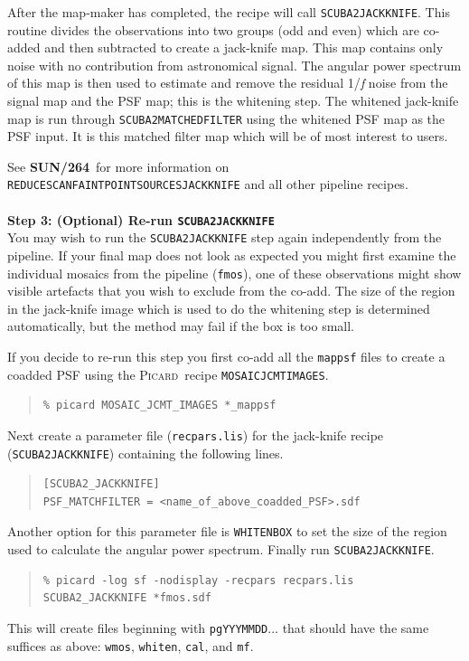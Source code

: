 \documentclass[twoside,11pt]{article}
\newcommand{\xref}[3]{#1}
\renewcommand{\_}{\texttt{\symbol{95}}}
\newenvironment{myquote}{
   \color{MidnightBlue}\begin{quote}\begin{small}}{
   \end{small}\end{quote}
}
\newcommand{\picard}{\xref{\textsc{Picard}}{sun265}{}}
\newcommand{\drrecipe}[1]{\texttt{#1}}
\newcommand{\param}[1]{\texttt{#1}}
\newcommand{\file}[1]{\texttt{#1}}
\newcommand{\pipelinesun}{\xref{\textbf{SUN/264}}{sun264}{}}
\renewenvironment{myquote}{
      \begin{quote}\begin{small}}{
      \end{small}\end{quote}
   }
\begin{document}
After the map-maker has completed, the recipe will call
\xref{\drrecipe{SCUBA2\_JACKKNIFE}}{sun265}{SCUBA2_JACKKNIFE}. This
routine divides the observations into two groups (odd and even) which
are co-added and then subtracted to create a jack-knife map. This map
contains only noise with no contribution from astronomical signal. The
angular power spectrum of this map is then used to estimate and remove
the residual 1/\emph{f} noise from the signal map and the PSF map;
this is the whitening step. The whitened jack-knife map is run through
\xref{\drrecipe{SCUBA2\_MATCHED\_FILTER}}{sun265}{SCUBA2_MATCHED_FILTER}
using the whitened PSF map as the PSF input. It is this matched filter
map which will be of most interest to users.

See \pipelinesun\ for more information on
\drrecipe{REDUCE\_SCAN\_FAINT\_POINT\_SOURCES\_JACKKNIFE} and all other pipeline
recipes.
\\ \\
\textbf{Step 3: (Optional) Re-run \drrecipe{SCUBA2\_JACKKNIFE}}\\
You may wish to run the \drrecipe{SCUBA2\_JACKKNIFE} step again
independently from the pipeline. If your final map does not look as
expected you might first examine the individual mosaics from the
pipeline (\file{\_fmos}), one of these observations might show visible
artefacts that you wish to exclude from the co-add. The size of the
region in the jack-knife image which is used to do the whitening step
is determined automatically, but the method may fail if the box is too
small.

If you decide to re-run this step you first co-add all the
\file{\_mappsf} files to create a coadded PSF using the \picard\ recipe
\xref{\drrecipe{MOSAIC\_JCMT\_IMAGES}}{sun265}{MOSAIC_JCMT_IMAGES}.
\begin{myquote}
\begin{verbatim}
% picard MOSAIC_JCMT_IMAGES *_mappsf
\end{verbatim}
\end{myquote}
Next create a parameter file (\file{recpars.lis}) for the jack-knife
recipe (\drrecipe{SCUBA2\_JACKKNIFE}) containing the following lines.
\begin{quote}
\begin{verbatim}
[SCUBA2_JACKKNIFE]
PSF_MATCHFILTER = <name_of_above_coadded_PSF>.sdf
\end{verbatim}
\end{quote}
Another option for this parameter file is \param{WHITEN\_BOX} to set the
size of the region used to calculate the angular power spectrum.
Finally run \drrecipe{SCUBA2\_JACKKNIFE}.
\begin{myquote}
\begin{verbatim}
% picard -log sf -nodisplay -recpars recpars.lis SCUBA2_JACKKNIFE *fmos.sdf
\end{verbatim}
\end{myquote}
This will create files beginning with \file{pgYYYMMDD}$\ldots$ that
should have the same suffices as above: \file{\_wmos},
\file{\_whiten}, \file{\_cal}, and \file{\_mf}.
\end{document}
